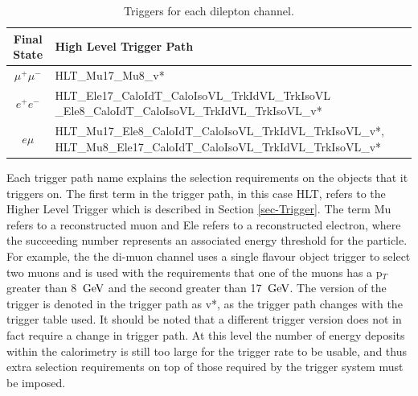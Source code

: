 \begin{table} 
\begin{center}
\begin{tabular}{|c|p{11.5cm}|}
\hline
	\textbf{Final State} & \textbf{High Level Trigger Path} \\
\hline
	$\mu^+\mu^-$ & HLT\_Mu17\_Mu8\_v* \\
	$e^+e^-$ & HLT\_Ele17\_CaloIdT\_CaloIsoVL\_TrkIdVL\_TrkIsoVL
				\_Ele8\_CaloIdT\_CaloIsoVL\_TrkIdVL\_TrkIsoVL\_v* \\
	$e\mu$ & HLT\_Mu17\_Ele8\_CaloIdT\_CaloIsoVL\_TrkIdVL\_TrkIsoVL\_v*, HLT\_Mu8\_Ele17\_CaloIdT\_CaloIsoVL\_TrkIdVL\_TrkIsoVL\_v* \\
\hline	
\end{tabular}
\end{center}
\caption{Triggers for each dilepton channel.}
\label{tab-HLTriggers}
\end{table}

Each trigger path name explains the selection requirements on the objects that it triggers on. The first term in the trigger path, in this case HLT, refers to the Higher Level Trigger which is described in Section \ref{sec-Trigger}. The term Mu refers to a reconstructed muon and Ele refers to a reconstructed electron, where the succeeding number represents an associated energy threshold for the particle. For example, the the di-muon channel uses a single flavour object trigger to select two muons and is used with the requirements that one of the muons has a p$_T$ greater than 8 $\,\text{Ge\hspace{-.08em}V}$ and the second greater than 17 $\,\text{Ge\hspace{-.08em}V}$. The version of the trigger is denoted in the trigger path as v*, as the trigger path changes with the trigger table used. It should be noted that a different trigger version does not in fact require a change in trigger path. At this level the number of energy deposits within the calorimetry is still too large for the trigger rate to be usable, and thus extra selection requirements on top of those required by the trigger system must be imposed.

